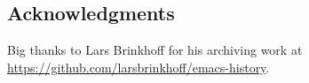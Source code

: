 \documentclass[format=acmsmall, review=false, screen=true]{acmart}
\begin{document}
\subsection{Acknowledgments}

Big thanks to Lars Brinkhoff for his archiving work at
\url{https://github.com/larsbrinkhoff/emacs-history}.




\end{document}
